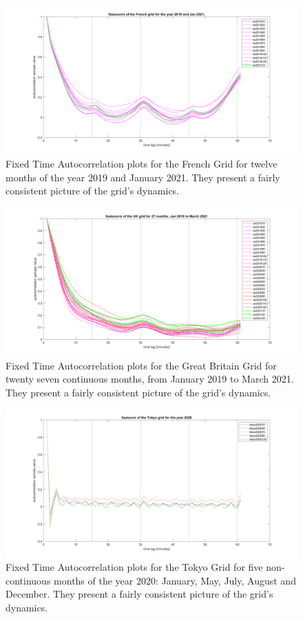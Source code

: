 \begin{figure}[!ht]
	\includegraphics[scale=0.25]{../figures/autocorr/fautocorrs_rte_201901_to_201912_202101}
	\caption{Fixed Time Autocorrelation plots for the French Grid for twelve months of the year 2019 and January 2021. They present a fairly consistent picture of the grid's dynamics.}
\end{figure}

\begin{figure}[!ht]
	\includegraphics[scale=0.25]{../figures/autocorr/fautocorrs_uk_201901_to_202103_2}
	\caption{Fixed Time Autocorrelation plots for the Great Britain Grid for twenty seven continuous months, from January 2019 to March 2021. They present a fairly consistent picture of the grid's dynamics.}
\end{figure}

\begin{figure}[!ht]
	\includegraphics[scale=0.25]{../figures/autocorr/fautocorrs_tokyo_202001_to_202012}
	\caption{Fixed Time Autocorrelation plots for the Tokyo Grid for five non-continuous months of the year 2020: January, May, July, August and December. They present a fairly consistent picture of the grid's dynamics.}
\end{figure}

